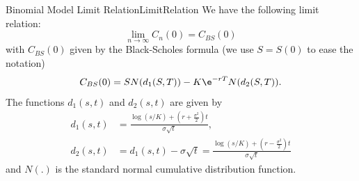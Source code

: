 \begin{prop}{Binomial Model Limit Relation}{LimitRelation}
	We have the following limit relation:
	\[
		\lim_{n\to\infty} C_n(0) = C_{BS}(0)
	\]
	with \(C_{BS}(0)\) given by the Black-Scholes formula (we use \(S = S(0)\) to ease the notation)
	\begin{equation}
		C_{BS}(0) = S N(d_1(S,T)) - K \e^{-rT} N(d_2(S,T)). \label{eq:BlackScholesFormula}
	\end{equation}
	The functions \(d_1(s,t)\) and \(d_2(s,t)\) are given by
	\begin{align*}
		d_1(s,t) & = \frac{\log(s/K) + (r + \frac{\sigma^2}{2})t}{\sigma\sqrt{t}},                            \\
		d_2(s,t) & = d_1(s,t) - \sigma\sqrt{t} = \frac{\log(s/K) + (r - \frac{\sigma^2}{2})t}{\sigma\sqrt{t}}
	\end{align*}
	and \(N(.)\) is the standard normal cumulative distribution function.
\end{prop}

